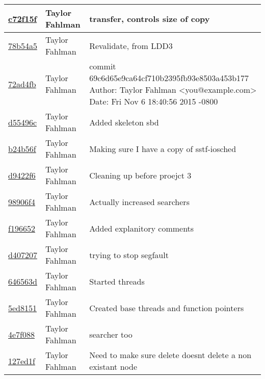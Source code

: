 \begin{tabular}{l l l}
\href{https://github.com/fahlmant/cs444/commit/c72f15f69feb16d4c5c931a1ac1fa7bee9f50e54}{c72f15f} & Taylor Fahlman & transfer, controls size of copy\\\hline
\href{https://github.com/fahlmant/cs444/commit/78b54a5482e78e99c49671fc1bdfc4220cd15e69}{78b54a5} & Taylor Fahlman & Revalidate, from LDD3\\\hline
\href{https://github.com/fahlmant/cs444/commit/72ad4fb072c815d6c043cda034900290b946487f}{72ad4fb} & Taylor Fahlman & commit 69c6d65e9ca64cf710b2395fb93e8503a453b177 Author: Taylor Fahlman <you@example.com> Date:   Fri Nov 6 18:40:56 2015 -0800\\\hline
\href{https://github.com/fahlmant/cs444/commit/d55496cb5992fb77bf617407c1780b2bda22e95b}{d55496c} & Taylor Fahlman & Added skeleton sbd\\\hline
\href{https://github.com/fahlmant/cs444/commit/b24b56fd7a67cd25cae6c0711a306da74a8d7afd}{b24b56f} & Taylor Fahlman & Making sure I have a copy of sstf-iosched\\\hline
\href{https://github.com/fahlmant/cs444/commit/d9422f60653bf4faec3d8f4d7956d74635c64ec1}{d9422f6} & Taylor Fahlman & Cleaning up before proejct 3\\\hline
\href{https://github.com/fahlmant/cs444/commit/98906f41c1901e64ccfbd48175591f9cb4e3e564}{98906f4} & Taylor Fahlman & Actually increased searchers\\\hline
\href{https://github.com/fahlmant/cs444/commit/f1966525e032f176f800cde247991a191c6e96e8}{f196652} & Taylor Fahlman & Added explanitory comments\\\hline
\href{https://github.com/fahlmant/cs444/commit/d4072075c5ac343e9ba1d4fd53da5062d2db6b60}{d407207} & Taylor Fahlman & trying to stop segfault\\\hline
\href{https://github.com/fahlmant/cs444/commit/646563dfc803868c671fc00b9d63418021f4bfe2}{646563d} & Taylor Fahlman & Started threads\\\hline
\href{https://github.com/fahlmant/cs444/commit/5ed8151b742665756b9fde5e531f37ef0e50df03}{5ed8151} & Taylor Fahlman & Created base threads and function pointers\\\hline
\href{https://github.com/fahlmant/cs444/commit/4e7f0888594cdcc6ca918e340622a0c292855ef2}{4e7f088} & Taylor Fahlman & searcher too\\\hline
\href{https://github.com/fahlmant/cs444/commit/127ed1fa55392ce67c5082eed8e2f7a73db2026b}{127ed1f} & Taylor Fahlman & Need to make sure delete doesnt delete a non existant node\\\hline

\end{tabular}
